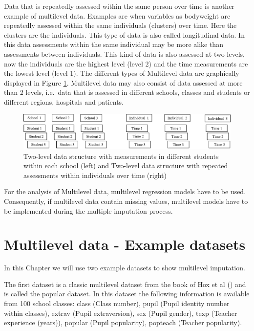 \documentclass[
]{book}
\begin{document}
Data that is repeatedly assessed within the same person over time is another example of multilevel data. Examples are when variables as bodyweight are repeatedly assessed within the same individuals (clusters) over time. Here the clusters are the individuals. This type of data is also called longitudinal data. In this data assessments within the same individual may be more alike than assessments between individuals. This kind of data is also assessed at two levels, now the individuals are the highest level (level 2) and the time measurements are the lowest level (level 1). The different types of Multilevel data are graphically displayed in Figure \ref{fig:fig71}. Multilevel data may also consist of data assessed at more than 2 levels, i.e.~data that is assessed in different schools, classes and students or different regions, hospitals and patients.

\begin{figure}

{\centering \includegraphics[width=0.9\linewidth]{images/fig7.1} 

}

\caption{Two-level data structure with measurements in different students within each school (left) and Two-level data structure with repeated assessments within individuals over time (right)}\label{fig:fig71}
\end{figure}

For the analysis of Multilevel data, multilevel regression models have to be used. Consequently, if multilevel data contain missing values, multilevel models have to be implemented during the multiple imputation process.

\hypertarget{multilevel-data---example-datasets}{%
\section{Multilevel data - Example datasets}\label{multilevel-data---example-datasets}}

In this Chapter we will use two example datasets to show multilevel imputation.

The first dataset is a classic multilevel dataset from the book of Hox et al (\citet{hox2018multilevelanalysis}) and is called the popular dataset. In this dataset the following information is available from 100 school classes: class (Class number), pupil (Pupil identity number within classes), extrav (Pupil extraversion), sex (Pupil gender), texp (Teacher experience (years)), popular (Pupil popularity), popteach (Teacher popularity).
\end{document}
